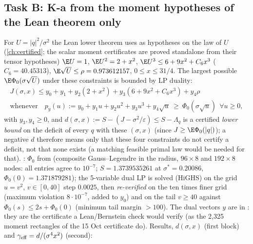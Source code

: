 \subsection{Task B: K-a from the moment hypotheses of the Lean theorem only}\label{sec:certs-Ka}
For $U=|q|^2/\sigma^2$ the Lean lower theorem uses as hypotheses on the law of $U$ (\autoref{ch:certified}; the scalar moment certificates are proved standalone from their tensor hypotheses) $\E U=1$, $\E U^2=2+x^2$, $\E U^3\le6+9x^2+C_6x^3$ ($C_6=40.45313$), $\E\sqrt U\le\rho=0.973612157$, $0\le x\le31/4$. The
largest possible $\E\Phi_0(\sigma\sqrt U)$ under these constraints is bounded by LP duality:
\[\begin{gathered}
J(\sigma,x)\le y_0+y_1+y_2(2+x^2)+y_3(6+9x^2+C_6x^3)+y_4\rho\\
\text{whenever}\quad p_y(u):=y_0+y_1u+y_2u^2+y_3u^3+y_4\sqrt u\ \ge\ \Phi_0(\sigma\sqrt u)\ \ \forall u\ge0,
\end{gathered}\]
with $y_3,y_4\ge0$,
and $d(\sigma,x):=S-(J-\sigma^2/\varepsilon)\le S-\Lambda_q$ is a certified \emph{lower bound} on the deficit of every $q$ with these $(\sigma,x)$ (since $J\ge\E\Phi_0(|q|)$); a negative $d$ therefore means only that these four constraints do not certify a deficit, not that none exists (a matching feasible primal law would be needed for that). : $\Phi_0$ from  (composite
Gauss--Legendre in the radius, $96\times8$ and $192\times8$ nodes: all entries agree to $10^{-7}$; $S=1.3739535261$ at $\sigma^*=0.20086$, $\Phi_0(0)=1.371879281$); the 5-variable dual LP is solved
(HiGHS) on the grid $u=v^2$, $v\in[0,40]$ step $0.0025$, then \emph{re-verified} on the ten times finer grid (maximum violation $8\cdot10^{-7}$, added to $y_0$) and on the tail $v\ge40$ against
$\Phi_0(s)\le2s+\Phi_0(0)$ (minimum tail margin $>100$). The dual vectors $y$ are in : they are the certificate a Lean/Bernstein check would verify (as the 2,325 moment
rectangles of the 15 Oct certificate do). Results, $d(\sigma,x)$ (first block) and $\gamma_{\rm eff}=d/(\sigma^4x^2)$ (second):
